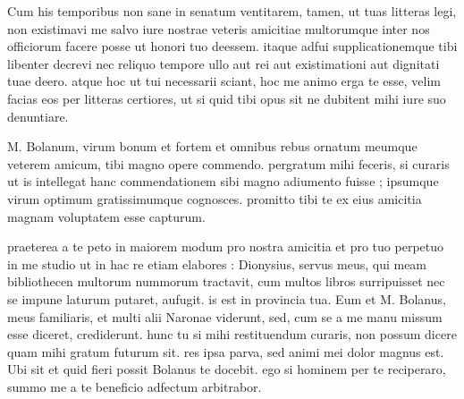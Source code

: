 


 Cum his temporibus non sane in senatum ventitarem, tamen, ut tuas litteras legi, non existimavi me salvo iure nostrae veteris amicitiae multorumque inter nos officiorum facere posse ut honori tuo deessem. itaque adfui supplicationemque tibi libenter decrevi nec reliquo tempore ullo aut rei aut existimationi aut dignitati tuae deero. atque hoc ut tui necessarii sciant, hoc me animo erga te esse, velim facias eos per litteras certiores, ut si quid tibi opus sit ne dubitent mihi iure suo denuntiare.

 M. Bolanum, virum bonum et fortem et omnibus rebus ornatum meumque veterem amicum, tibi magno opere commendo. pergratum mihi feceris, si curaris ut is intellegat hanc commendationem sibi magno adiumento fuisse ; ipsumque virum optimum gratissimumque cognosces. promitto tibi te ex eius amicitia magnam voluptatem esse capturum.

 praeterea a te peto in maiorem modum pro nostra amicitia et pro tuo perpetuo in me studio ut in hac re etiam elabores : Dionysius, servus meus, qui meam bibliothecen multorum nummorum tractavit, cum multos libros surripuisset nec se impune laturum putaret, aufugit. is est in provincia tua. Eum et M. Bolanus, meus familiaris, et multi alii Naronae viderunt, sed, cum se a me manu missum esse diceret, crediderunt. hunc tu si mihi restituendum curaris, non possum dicere quam mihi gratum futurum sit. res ipsa parva, sed animi mei dolor magnus est. Ubi sit et quid fieri possit Bolanus te docebit. ego si hominem per te reciperaro, summo me a te beneficio adfectum arbitrabor.

